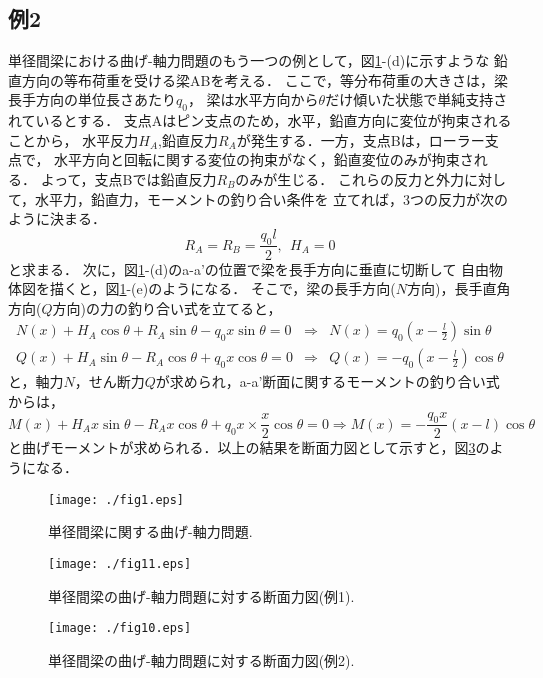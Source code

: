 \documentclass[10pt,a4j]{jarticle}
\begin{document}
\subsection{例2}
単径間梁における曲げ-軸力問題のもう一つの例として，図\ref{fig:fig12_1}-(d)に示すような
鉛直方向の等布荷重を受ける梁ABを考える．
ここで，等分布荷重の大きさは，梁長手方向の単位長さあたり$q_0$，
梁は水平方向から$\theta$だけ傾いた状態で単純支持されているとする．
支点Aはピン支点のため，水平，鉛直方向に変位が拘束されることから，
水平反力$H_A$,鉛直反力$R_A$が発生する．一方，支点Bは，ローラー支点で，
水平方向と回転に関する変位の拘束がなく，鉛直変位のみが拘束される．
よって，支点Bでは鉛直反力$R_B$のみが生じる．
これらの反力と外力に対して，水平力，鉛直力，モーメントの釣り合い条件を
立てれば，3つの反力が次のように決まる．
\begin{equation}
	R_A=R_B=\frac{q_0l}{2}, \ \ H_A=0
\end{equation}
と求まる．
次に，図\ref{fig:fig12_1}-(d)のa-a'の位置で梁を長手方向に垂直に切断して
自由物体図を描くと，図\ref{fig:fig12_1}-(e)のようになる．
そこで，梁の長手方向($N$方向)，長手直角方向($Q$方向)の力の釣り合い式を立てると，
\begin{eqnarray}
	N(x)+H_A\cos\theta +R_A\sin\theta - q_0x\sin \theta =0 
	& \Rightarrow  & 
	N(x)=q_0\left(x-\frac{l}{2}\right)\sin\theta
	\\
	Q(x)+H_A\sin\theta -R_A\cos\theta +q_0x\cos \theta =0 
	& \Rightarrow  &  
	Q(x)=-q_0\left(x-\frac{l}{2}\right) \cos\theta	
\end{eqnarray}
と，軸力$N$，せん断力$Q$が求められ，a-a'断面に関するモーメントの釣り合い式からは，
\begin{equation}
	M(x)+H_Ax\sin\theta -R_Ax\cos\theta +q_0x\times \frac{x}{2}\cos \theta =0 
	\Rightarrow    
	M(x)=-\frac{q_0x}{2}\left(x-l\right)\cos\theta
\end{equation}
と曲げモーメントが求められる．以上の結果を断面力図として示すと，図\ref{fig:fig12_1_2}のようになる．
\begin{figure}[h]
	\begin{center}
	\texttt{[image: ./fig1.eps]} 
	\end{center}
	\caption{
		単径間梁に関する曲げ-軸力問題.
	} 
	\label{fig:fig12_1}
\end{figure}
\begin{figure}[h]
	\begin{center}
	\texttt{[image: ./fig11.eps]} 
	\end{center}
	\caption{
		単径間梁の曲げ-軸力問題に対する断面力図(例1).
	} 
	\label{fig:fig12_1_1}
\end{figure}
\begin{figure}[h]
	\begin{center}
	\texttt{[image: ./fig10.eps]} 
	\end{center}
	\caption{
		単径間梁の曲げ-軸力問題に対する断面力図(例2).
	} 
	\label{fig:fig12_1_2}
\end{figure}
\end{document}
